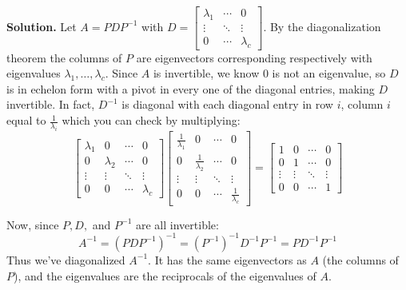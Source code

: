 \documentclass[11pt, letterpaper]{report}
\newenvironment{book}{}{}
\newcounter{theorem}[chapter]
\begin{document}
\begin{book}
\textbf{Solution.} Let $A =PDP^{-1}$ with $D= \begin{bmatrix}
\lambda_1 & \cdots & 0 \\
\vdots & \ddots & \vdots \\
0 & \cdots & \lambda_c
\end{bmatrix}$. By the diagonalization theorem the columns of $P$ are eigenvectors corresponding respectively with eigenvalues $\lambda_1, \ldots, \lambda_c$. Since $A$ is invertible, we know 0 is not an eigenvalue, so $D$ is in echelon form with a pivot in every one of the diagonal entries, making $D$ invertible. In fact, $D^{-1}$ is diagonal with each diagonal entry in row $i$, column $i$ equal to $\frac{1}{\lambda_i}$ which you can check by multiplying:
\[\begin{bmatrix}
\lambda_1 & 0 & \cdots & 0 \\
0 & \lambda_2 & \cdots & 0 \\
\vdots & \vdots & \ddots & \vdots \\
0 & 0 & \cdots & \lambda_c
\end{bmatrix} \begin{bmatrix}
\frac{1}{\lambda_1} & 0 & \cdots & 0 \\
0 & \frac{1}{\lambda_2} & \cdots & 0 \\
\vdots & \vdots & \ddots & \vdots \\
0 & 0 & \cdots & \frac{1}{\lambda_c}
\end{bmatrix} = \begin{bmatrix}
1 & 0 & \cdots & 0 \\
0 & 1 & \cdots & 0 \\
\vdots & \vdots & \ddots & \vdots \\
0 & 0 & \cdots & 1
\end{bmatrix}\]

Now, since $P, D,$ and $P^{-1}$ are all invertible:
\[A^{-1} = ( PDP^{-1} )^{-1} = ( P^{-1} )^{-1}D^{-1}P^{-1} = PD^{-1}P^{-1} \]
Thus we've diagonalized $A^{-1}$. It has the same eigenvectors as $A$ (the columns of $P$), and the eigenvalues are the reciprocals of the eigenvalues of $A$.

\end{book}
\end{document}
